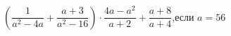 \begin{ex}[type=simplify_calculate]
	\begin{condition}
		\( \left( \dfrac{1}{a^2-4a}+\dfrac{a+3}{a^2-16} \right)\cdot\dfrac{4a-a^2}{a+2}+\dfrac{a+8}{a+4} \),\quad если \( a=56 \)
	\end{condition}
\end{ex}